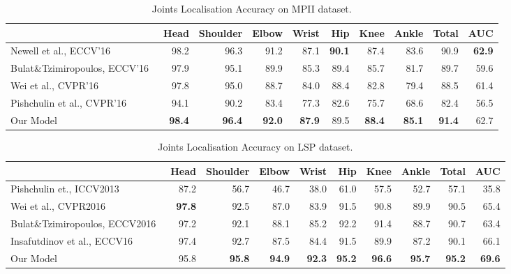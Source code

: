 \begin{table}[t!]
\small
\begin{center}
\begin{tabular}{|l|r|r|r|r|r|r|r|r|r|}
\hline
 &\textbf{Head}   & \textbf{Shoulder} & \textbf{Elbow} & \textbf{Wrist} & \textbf{Hip}   & \textbf{Knee} & \textbf{Ankle} & \textbf{Total} & \textbf{AUC} \\
\hline\hline
Newell et al., ECCV'16~\cite{newell2016stacked}       & 98.2  & 96.3  & 91.2  & 87.1  & \textbf{90.1}  & 87.4 & 83.6 & 90.9 & \textbf{62.9} \\
Bulat\&Tzimiropoulos, ECCV'16~\cite{bulat2016human} & 97.9  & 95.1  & 89.9  & 85.3  & 89.4  & 85.7 & 81.7 & 89.7 & 59.6 \\
Wei et al., CVPR'16~\cite{wei2016convolutional}          & 97.8  & 95.0  & 88.7  & 84.0  & 88.4  & 82.8 & 79.4 & 88.5 & 61.4 \\
Pishchulin et al., CVPR'16~\cite{pishchulin16cvpr}   & 94.1  & 90.2  & 83.4  & 77.3  & 82.6  & 75.7 & 68.6 & 82.4 & 56.5 \\
\hline
Our Model                     & \textbf{98.4}  & \textbf{96.4}  & \textbf{92.0}  & \textbf{87.9}  & 89.5  & \textbf{88.4} & \textbf{85.1} & \textbf{91.4} & 62.7 \\
\hline
\end{tabular}
\end{center}
\caption{Joints Localisation Accuracy on MPII dataset.}
\label{tab:mpii}
\end{table}
\begin{table}[t!]
\small
\begin{center}
\begin{tabular}{|l|r|r|r|r|r|r|r|r|r|}
\hline
 &\textbf{Head}   & \textbf{Shoulder} & \textbf{Elbow} & \textbf{Wrist} & \textbf{Hip}   & \textbf{Knee} & \textbf{Ankle} & \textbf{Total} & \textbf{AUC} \\
\hline\hline
Pishchulin et., ICCV2013~\cite{pishchulin2013poselet} & 87.2  & 56.7  & 46.7  & 38.0  & 61.0  & 57.5 & 52.7 & 57.1 & 35.8\\
Wei et al., CVPR2016~\cite{wei2016convolutional} & \textbf{97.8}  & 92.5  & 87.0  & 83.9  & 91.5  & 90.8 & 89.9 & 90.5 & 65.4\\
Bulat\&Tzimiropoulos, ECCV2016~\cite{bulat2016human}& 97.2  & 92.1  & 88.1  & 85.2  & 92.2  & 91.4 & 88.7 & 90.7 & 63.4\\
Insafutdinov et al., ECCV16~\cite{insafutdinov16ariv}& 97.4  & 92.7  & 87.5  & 84.4  & 91.5  & 89.9 & 87.2 & 90.1 & 66.1\\
\hline
Our Model& 95.8  & \textbf{95.8}  & \textbf{94.9}  & \textbf{92.3}  & \textbf{95.2}  & \textbf{96.6} & \textbf{95.7} & \textbf{95.2} & \textbf{69.6}\\
\hline
\end{tabular}
\end{center}
\caption{Joints Localisation Accuracy on LSP dataset.}
\label{tab:lsp}
\end{table}


